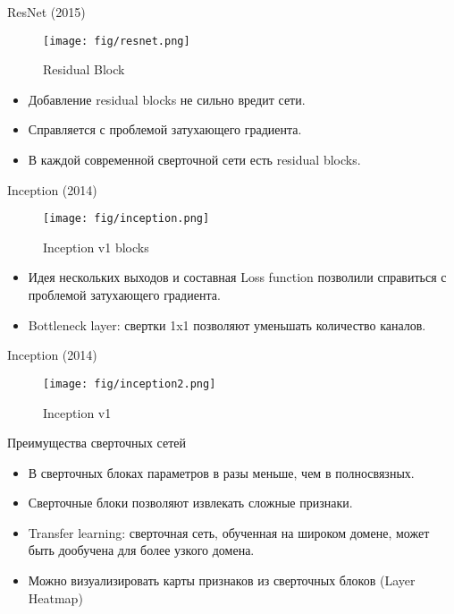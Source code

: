 \documentclass[handout]{beamer}
\begin{document}
\begin{frame}{ResNet (2015)}
	\begin{figure}
	    \texttt{[image: fig/resnet.png]}
	    \caption{\small Residual Block
	    } 
	    \label{fig:w_series}
	\end{figure}
	\begin{itemize}
		\item Добавление residual blocks не сильно вредит сети.
		\item Справляется с проблемой затухающего градиента.
		\item В каждой современной сверточной сети есть residual blocks.
	\end{itemize}
\end{frame}

\begin{frame}{Inception (2014)}
	\begin{figure}
	    \texttt{[image: fig/inception.png]}
	    \caption{\small Inception v1 blocks
	    } 
	    \label{fig:w_series}
	\end{figure}
	\begin{itemize}
		\item Идея нескольких выходов и составная Loss function позволили справиться с проблемой затухающего градиента.
		\item Bottleneck layer: свертки 1x1 позволяют уменьшать количество каналов.
	\end{itemize}
\end{frame}

\begin{frame}{Inception (2014)}
	\begin{figure}
	    \texttt{[image: fig/inception2.png]}
	    \caption{\small Inception v1
	    } 
	    \label{fig:w_series}
	\end{figure}
\end{frame}

\begin{frame}{Преимущества сверточных сетей}
	\begin{itemize}
		\item В сверточных блоках параметров в разы меньше, чем в полносвязных.
		\item Сверточные блоки позволяют извлекать сложные признаки.
		\item Transfer learning: сверточная сеть, обученная на широком домене, может быть дообучена для более узкого домена.
		\item Можно визуализировать карты признаков из сверточных блоков (Layer Heatmap)
	\end{itemize}
\end{frame}
\end{document}
